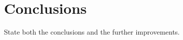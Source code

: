 \chapter{Conclusions}
\label{chp:conclusions}
State both the conclusions and the further improvements.





